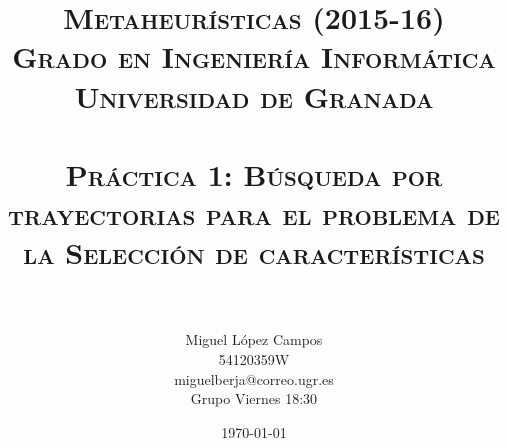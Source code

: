

\title{
\normalfont \normalsize 
\textsc{{\bf Metaheurísticas (2015-16) \\ Grado en Ingeniería Informática \\ Universidad de Granada} \\ [25pt] %
\horrule{0.5pt} \\[0.4cm] %
\huge Práctica 1: Búsqueda por trayectorias para el problema de la Selección de características \\ %
\horrule{2pt} \\[0.5cm] %
}}
\author{Miguel López Campos\\ 54120359W\\ miguelberja@correo.ugr.es\\ Grupo Viernes 18:30} %


\date{\normalsize\today} %


	
	\maketitle %
	\newpage %
	
	\tableofcontents %
	\listoffigures

	
	\newpage
	
	\
	
	
	
